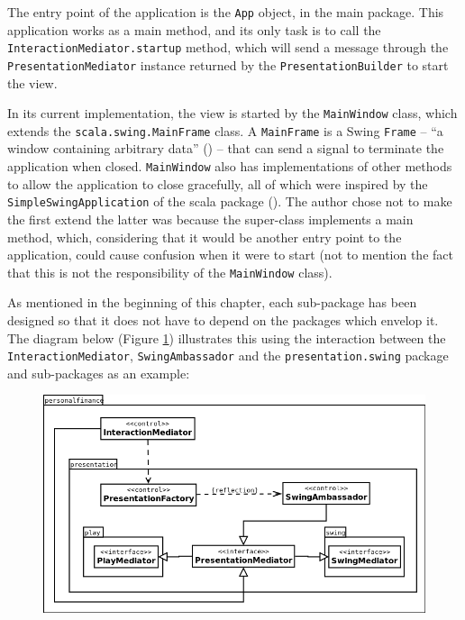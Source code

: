 The entry point of the application is the \texttt{App} object, in the main
package. This application works as a main method, and its only task is to
call the \texttt{InteractionMediator.startup} method, which will send a
message through the \texttt{PresentationMediator} instance returned by the
\texttt{PresentationBuilder} to start the view.

\begin{sloppypar}
  In its current implementation, the view is started by the \texttt{MainWindow}
  class, which extends the \texttt{scala.swing.MainFrame} class. A
  \texttt{MainFrame} is a Swing \texttt{Frame} -- ``a window containing
  arbitrary data'' (\cite[][Ch.~34,~Section~34.1]{odersky2016scala}) -- that
  can send a signal to terminate the application when closed.
  \texttt{MainWindow} also has implementations of other methods to allow the
  application to close gracefully, all of which were inspired by the
  \texttt{SimpleSwingApplication} of the scala package
  (\cite[][p.~2~\&~3]{maier2009scala}). The author chose not to make the first
  extend the latter was because the super-class implements a main method,
  which, considering that it would be another entry point to the application,
  could cause confusion when it were to start (not to mention the fact that
  this is not the responsibility of the \texttt{MainWindow} class).
\end{sloppypar}


As mentioned in the beginning of this chapter, each sub-package has been
designed so that it does not have to depend on the packages which envelop it.
The diagram below (Figure \ref{fig:PresentationMVC}) illustrates this using the
interaction between the \texttt{InteractionMediator}, \texttt{SwingAmbassador}
and the \texttt{presentation.swing} package and sub-packages as an example:

\begin{figure}[ht!]
  \begin{center}
    \includegraphics[width=15cm]{contents/img/Package_Diagram_-_Presentation_MVC.png}
  \end{center}
  \caption{}
  \label{fig:PresentationMVC}
\end{figure}
\FloatBarrier


